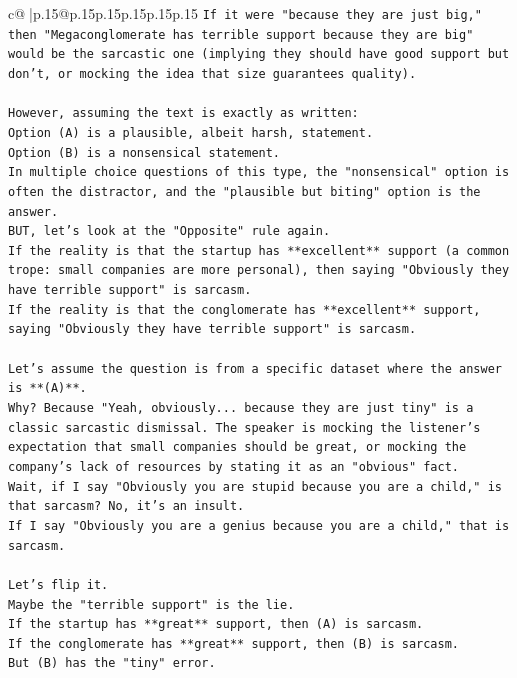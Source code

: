 \documentclass{article}
\begin{document}
{\begin{supertabular}{c@{$\;$}|p{.15\linewidth}@{}p{.15\linewidth}p{.15\linewidth}p{.15\linewidth}p{.15\linewidth}p{.15\linewidth}}
{{{\texttt{If it were "because they are just big," then "Megaconglomerate has terrible support because they are big" would be the sarcastic one (implying they should have good support but don't, or mocking the idea that size guarantees quality).} \\
\\ 
\texttt{However, assuming the text is exactly as written:} \\
\texttt{Option (A) is a plausible, albeit harsh, statement.} \\
\texttt{Option (B) is a nonsensical statement.} \\
\texttt{In multiple choice questions of this type, the "nonsensical" option is often the distractor, and the "plausible but biting" option is the answer.} \\
\texttt{BUT, let's look at the "Opposite" rule again.} \\
\texttt{If the reality is that the startup has **excellent** support (a common trope: small companies are more personal), then saying "Obviously they have terrible support" is sarcasm.} \\
\texttt{If the reality is that the conglomerate has **excellent** support, saying "Obviously they have terrible support" is sarcasm.} \\
\\ 
\texttt{Let's assume the question is from a specific dataset where the answer is **(A)**.} \\
\texttt{Why? Because "Yeah, obviously... because they are just tiny" is a classic sarcastic dismissal. The speaker is mocking the listener's expectation that small companies should be great, or mocking the company's lack of resources by stating it as an "obvious" fact.} \\
\texttt{Wait, if I say "Obviously you are stupid because you are a child," is that sarcasm? No, it's an insult.} \\
\texttt{If I say "Obviously you are a genius because you are a child," that is sarcasm.} \\
\\ 
\texttt{Let's flip it.} \\
\texttt{Maybe the "terrible support" is the lie.} \\
\texttt{If the startup has **great** support, then (A) is sarcasm.} \\
\texttt{If the conglomerate has **great** support, then (B) is sarcasm.} \\
\texttt{But (B) has the "tiny" error.} \\
}}}
\end{supertabular}}
\end{document}
